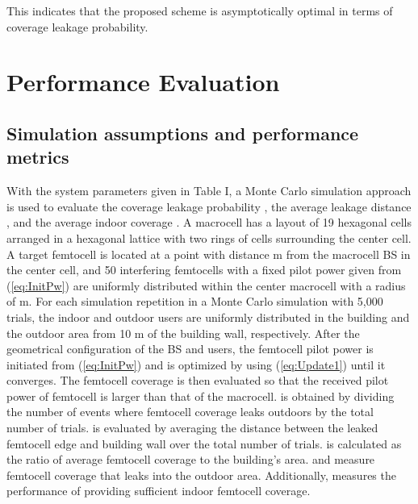 \documentclass[draftclsnofoot,12pt,onecolumn]{IEEEtran}
\begin{document}
This indicates that the proposed scheme is asymptotically optimal in
terms of coverage leakage probability.





\section{Performance Evaluation}\label{sec:results}
\subsection{Simulation assumptions and performance metrics}
With the system parameters given in Table I, a Monte Carlo
simulation approach is used to evaluate the coverage leakage
probability , the average leakage distance , and the
average indoor coverage . A macrocell has a layout of 19
hexagonal cells arranged in a hexagonal lattice with two rings of
cells surrounding the center cell. A target femtocell is located at
a point with distance  m from the macrocell BS in the
center cell, and 50 interfering femtocells with a fixed pilot power
given from (\ref{eq:InitPw}) are uniformly distributed within the
center macrocell with a radius of  m. For each simulation
repetition in a Monte Carlo simulation with 5,000 trials, the indoor
and outdoor users are uniformly distributed in the building and the
outdoor area from 10 m of the building wall, respectively. After
the geometrical configuration of the BS and users, the femtocell
pilot power is initiated from (\ref{eq:InitPw}) and is optimized by
using (\ref{eq:Update1}) until it converges. The femtocell coverage
is then evaluated so that the received pilot power of femtocell is
larger than that of the macrocell.  is obtained by dividing the
number of events where femtocell coverage leaks outdoors by the
total number of trials.  is evaluated by averaging the
distance between the leaked femtocell edge and building wall over
the total number of trials.  is calculated as the ratio of
average femtocell coverage to the building's area.  and
 measure femtocell coverage that leaks into the outdoor
area. Additionally,  measures the performance of providing
sufficient indoor femtocell coverage.
\end{document}
